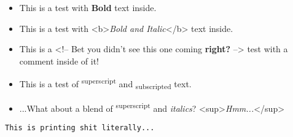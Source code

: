 \documentclass[12pt]{article}
\begin{document}
\begin{itemize}
	\item This is a test with \textbf{Bold} text inside.

	\item This is a test with <b>\textit{Bold and Italic}</b> text inside.

	\item This is a <!-- Bet you didn't see this one coming \textbf{right?} --> test with a comment inside of it!

	\item This is a test of \textsuperscript{superscript} and \textsubscript{subscripted} text.

	\item ...What about a blend of \textsuperscript{superscript} and \textit{italics}? <sup>\textit{Hmm...}</sup>

\end{itemize}
\begin{verbatim}This is printing shit literally...\end{verbatim}
\end{document}
